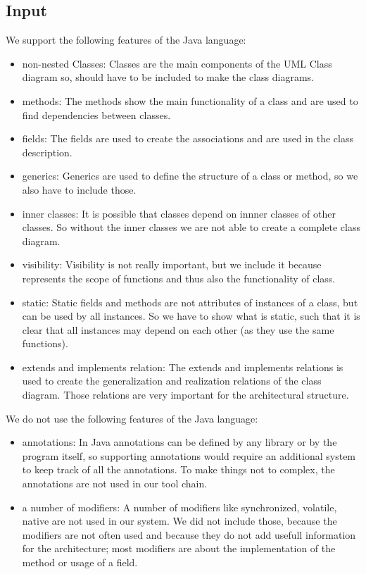 \documentclass[a4paper,11pt]{article}
\begin{document}
	\subsection{Input}
		We support the following features of the Java language:
		\begin{itemize}
			\item non-nested Classes: Classes are the main components of the UML Class diagram so, should have to be included to make the class diagrams.
			\item methods: The methods show the main functionality of a class and are used to find dependencies between classes.
			\item fields: The fields are used to create the associations and are used in the class description.
			\item generics: Generics are used to define the structure of a class or method, so we also have to include those. %
			\item inner classes: It is possible that classes depend on innner classes of other classes. So without the inner classes we are not able to create a complete class diagram.
			\item visibility: Visibility is not really important, but we include it because represents the scope of functions and thus also the functionality of class.
			\item static: Static fields and methods are not attributes of instances of a class, but can be used by all instances. So we have to show what is static, such that it is clear that all instances may depend on each other (as they use the same functions).
			\item extends and implements relation: The extends and implements relations is used to create the generalization and realization relations of the class diagram. Those relations are very important for the architectural structure.
			
		
		\end{itemize}
		
		We do not use the following features of the Java language:
		\begin{itemize}
			\item annotations: In Java annotations can be defined by any library or by the program itself, so supporting annotations would require an additional system to keep track of all the annotations. To make things not to complex, the annotations are not used in our tool chain.
			\item a number of modifiers: A number of modifiers like synchronized, volatile, native are not used in our system.
			We did not include those, because the modifiers are not often used and because they do not add usefull information for the architecture; most modifiers are about the implementation of the method or usage of a field.
		\end{itemize}
		
\end{document}
